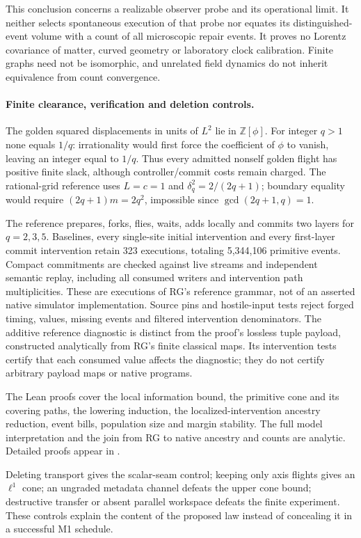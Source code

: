 This conclusion concerns a realizable observer probe and its operational
limit. It neither selects spontaneous execution of that probe nor equates
its distinguished-event volume with a count of all microscopic repair
events. It proves no Lorentz covariance of matter, curved geometry or
laboratory clock calibration. Finite graphs need not be isomorphic, and
unrelated field dynamics do not inherit equivalence from count convergence.

\paragraph{Finite clearance, verification and deletion controls.}
The golden squared displacements in units of $L^2$ lie in
$\mathbb Z[\phi]$. For integer $q>1$ none equals $1/q$: irrationality
would first force the coefficient of $\phi$ to vanish, leaving an integer
equal to $1/q$. Thus every admitted nonself golden flight has positive
finite slack, although controller/commit costs remain charged.
The rational-grid reference uses $L=c=1$ and
$\delta_q^2=2/(2q+1)$; boundary equality would require
$(2q+1)m=2q^2$, impossible since $\gcd(2q+1,q)=1$.

The reference prepares, forks, flies, waits, adds locally and commits two
layers for $q=2,3,5$. Baselines, every single-site initial intervention and
every first-layer commit intervention retain 323 executions, totaling
5,344,106 primitive events. Compact commitments
are checked against live streams and independent semantic replay, including
all consumed writers and intervention path multiplicities. These are
executions of RG's reference grammar, not of an asserted native simulator
implementation. Source pins and hostile-input tests reject forged timing,
values, missing events and filtered intervention denominators.
The additive reference diagnostic is distinct from the proof's lossless
tuple payload, constructed analytically from RG's finite classical maps.
Its intervention tests certify that each consumed value affects the
diagnostic; they do not certify arbitrary payload maps or native programs.

The Lean proofs cover the local information bound, the primitive cone and
its covering paths, the lowering induction, the localized-intervention
ancestry reduction, event bills, population size
and margin stability. The full model interpretation and the join from RG
to native ancestry and counts are analytic. Detailed proofs appear in
.

Deleting transport gives the scalar-seam control; keeping only axis flights
gives an $\ell^1$ cone; an ungraded metadata channel defeats the upper
cone bound; destructive transfer or absent parallel workspace defeats the
finite experiment. These controls explain the content of the proposed law
instead of concealing it in a successful M1 schedule.
